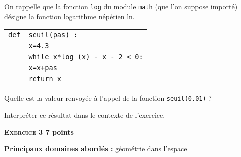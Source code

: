\documentclass[11pt]{article}
\begin{document}
\begin{enumerate}
On rappelle que la fonction \texttt{log} du module \texttt{math} (que l'on suppose importé)
désigne la fonction logarithme népérien ln.

\begin{center}
\begin{tabular}{|l l|} \hline
\texttt{def}& \texttt{seuil(pas) :}\\
&\texttt{x=4.3}\\
&\texttt{while x*log (x) - x - 2 < 0:}\\
&\quad \texttt{x=x+pas}\\
&\texttt{return x}\\ \hline
\end{tabular}
\end{center}

Quelle est la valeur renvoyée à l'appel de la fonction \texttt{seuil(0.01)} ?

Interpréter ce résultat dans le contexte de l'exercice.
\end{enumerate}

\bigskip

\textbf{\textsc{Exercice 3} \hfill 7 points}

\textbf{Principaux domaines abordés :} géométrie dans l'espace

\medskip
\end{document}
